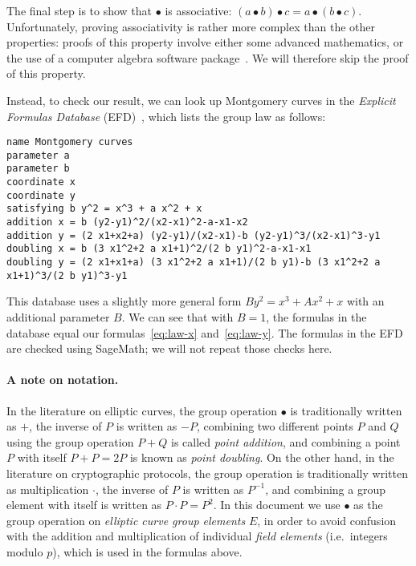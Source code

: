 \documentclass[manuscript]{acmart}
\begin{document}
The final step is to show that $\bullet$ is associative: $(a \bullet b) \bullet c = a \bullet (b \bullet c)$.
Unfortunately, proving associativity is rather more complex than the other properties: proofs of this property involve either some advanced mathematics, or the use of a computer algebra software package~\cite{Friedl:2017js,Fujii:2017eb}.
We will therefore skip the proof of this property.

Instead, to check our result, we can look up Montgomery curves in the \emph{Explicit Formulas Database} (EFD)~\cite{MontgomeryEFD}, which lists the group law as follows:
\begin{verbatim}
name Montgomery curves
parameter a
parameter b
coordinate x
coordinate y
satisfying b y^2 = x^3 + a x^2 + x
addition x = b (y2-y1)^2/(x2-x1)^2-a-x1-x2
addition y = (2 x1+x2+a) (y2-y1)/(x2-x1)-b (y2-y1)^3/(x2-x1)^3-y1
doubling x = b (3 x1^2+2 a x1+1)^2/(2 b y1)^2-a-x1-x1
doubling y = (2 x1+x1+a) (3 x1^2+2 a x1+1)/(2 b y1)-b (3 x1^2+2 a x1+1)^3/(2 b y1)^3-y1
\end{verbatim}
This database uses a slightly more general form $B y^2 = x^3 + A x^2 + x$ with an additional parameter $B$.
We can see that with $B=1$, the formulas in the database equal our formulas~\eqref{eq:law-x} and~\eqref{eq:law-y}.
The formulas in the EFD are checked using SageMath; we will not repeat those checks here.

\paragraph{A note on notation.}
In the literature on elliptic curves, the group operation $\bullet$ is traditionally written as $+$, the inverse of $P$ is written as $-P$, combining two different points $P$ and $Q$ using the group operation $P+Q$ is called \emph{point addition}, and combining a point $P$ with itself $P+P=2P$ is known as \emph{point doubling}.
On the other hand, in the literature on cryptographic protocols, the group operation is traditionally written as multiplication $\cdot$, the inverse of $P$ is written as $P^{-1}$, and combining a group element with itself is written as $P \cdot P = P^2$.
In this document we use $\bullet$ as the group operation on \emph{elliptic curve group elements} $E$, in order to avoid confusion with the addition and multiplication of individual \emph{field elements} (i.e.\ integers modulo $p$), which is used in the formulas above.
\end{document}
